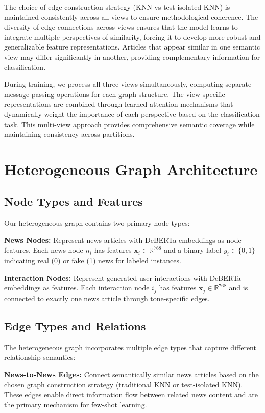 The choice of edge construction strategy (KNN vs test-isolated KNN) is maintained consistently across all views to ensure methodological coherence. The diversity of edge connections across views ensures that the model learns to integrate multiple perspectives of similarity, forcing it to develop more robust and generalizable feature representations. Articles that appear similar in one semantic view may differ significantly in another, providing complementary information for classification.

During training, we process all three views simultaneously, computing separate message passing operations for each graph structure. The view-specific representations are combined through learned attention mechanisms that dynamically weight the importance of each perspective based on the classification task. This multi-view approach provides comprehensive semantic coverage while maintaining consistency across partitions.

\section{Heterogeneous Graph Architecture}

\subsection{Node Types and Features}

Our heterogeneous graph contains two primary node types:

\textbf{News Nodes:} Represent news articles with DeBERTa embeddings as node features. Each news node $n_i$ has features $\mathbf{x}_i \in \mathbb{R}^{768}$ and a binary label $y_i \in \{0, 1\}$ indicating real (0) or fake (1) news for labeled instances.

\textbf{Interaction Nodes:} Represent generated user interactions with DeBERTa embeddings as features. Each interaction node $i_j$ has features $\mathbf{x}_j \in \mathbb{R}^{768}$ and is connected to exactly one news article through tone-specific edges.

\subsection{Edge Types and Relations}

The heterogeneous graph incorporates multiple edge types that capture different relationship semantics:

\textbf{News-to-News Edges:} Connect semantically similar news articles based on the chosen graph construction strategy (traditional KNN or test-isolated KNN). These edges enable direct information flow between related news content and are the primary mechanism for few-shot learning.

